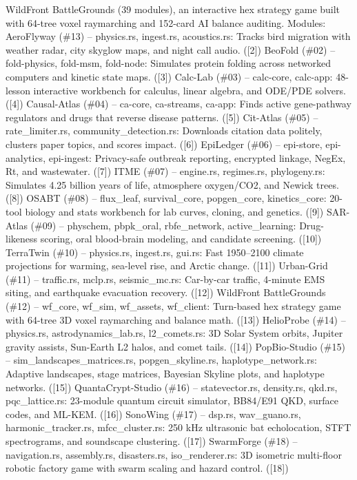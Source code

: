 \documentclass[10pt,letterpaper]{article}
\begin{document}
WildFront BattleGrounds (39 modules), an interactive hex strategy game built with 64-tree voxel raymarching and 152-card AI balance auditing. Modules: AeroFlyway (\#13) -- physics.rs, ingest.rs, acoustics.rs: Tracks bird migration with weather radar, city skyglow maps, and night call audio. ([2]) BeoFold (\#02) -- fold-physics, fold-msm, fold-node: Simulates protein folding across networked computers and kinetic state maps. ([3]) Calc-Lab (\#03) -- calc-core, calc-app: 48-lesson interactive workbench for calculus, linear algebra, and ODE/PDE solvers. ([4]) Causal-Atlas (\#04) -- ca-core, ca-streams, ca-app: Finds active gene-pathway regulators and drugs that reverse disease patterns. ([5]) Cit-Atlas (\#05) -- rate\_limiter.rs, community\_detection.rs: Downloads citation data politely, clusters paper topics, and scores impact. ([6]) EpiLedger (\#06) -- epi-store, epi-analytics, epi-ingest: Privacy-safe outbreak reporting, encrypted linkage, NegEx, Rt, and wastewater. ([7]) ITME (\#07) -- engine.rs, regimes.rs, phylogeny.rs: Simulates 4.25 billion years of life, atmosphere oxygen/CO2, and Newick trees. ([8]) OSABT (\#08) -- flux\_leaf, survival\_core, popgen\_core, kinetics\_core: 20-tool biology and stats workbench for lab curves, cloning, and genetics. ([9]) SAR-Atlas (\#09) -- physchem, pbpk\_oral, rbfe\_network, active\_learning: Drug-likeness scoring, oral blood-brain modeling, and candidate screening. ([10]) TerraTwin (\#10) -- physics.rs, ingest.rs, gui.rs: Fast 1950--2100 climate projections for warming, sea-level rise, and Arctic change. ([11]) Urban-Grid (\#11) -- traffic.rs, mclp.rs, seismic\_mc.rs: Car-by-car traffic, 4-minute EMS siting, and earthquake evacuation recovery. ([12]) WildFront BattleGrounds (\#12) -- wf\_core, wf\_sim, wf\_assets, wf\_client: Turn-based hex strategy game with 64-tree 3D voxel raymarching and balance math. ([13]) HelioProbe (\#14) -- physics.rs, astrodynamics\_lab.rs, l2\_comets.rs: 3D Solar System orbits, Jupiter gravity assists, Sun-Earth L2 halos, and comet tails. ([14]) PopBio-Studio (\#15) -- sim\_landscapes\_matrices.rs, popgen\_skyline.rs, haplotype\_network.rs: Adaptive landscapes, stage matrices, Bayesian Skyline plots, and haplotype networks. ([15]) QuantaCrypt-Studio (\#16) -- statevector.rs, density.rs, qkd.rs, pqc\_lattice.rs: 23-module quantum circuit simulator, BB84/E91 QKD, surface codes, and ML-KEM. ([16]) SonoWing (\#17) -- dsp.rs, wav\_guano.rs, harmonic\_tracker.rs, mfcc\_cluster.rs: 250 kHz ultrasonic bat echolocation, STFT spectrograms, and soundscape clustering. ([17]) SwarmForge (\#18) -- navigation.rs, assembly.rs, disasters.rs, iso\_renderer.rs: 3D isometric multi-floor robotic factory game with swarm scaling and hazard control. ([18])
\end{document}
